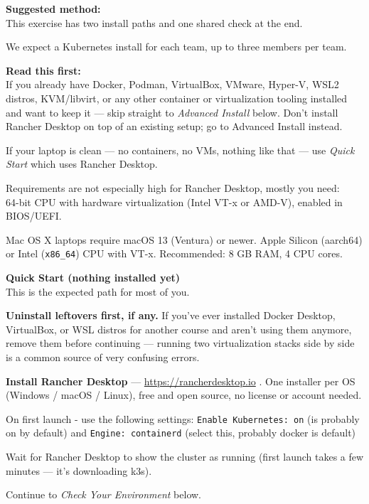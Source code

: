 \documentclass[a4paper,11pt,notitlepage]{report}
\begin{document}
{\bf Suggested method:}\\
This exercise has two install paths and one shared check at the end.

We expect a Kubernetes install for each team, up to three members per team.

{\bf Read this first:}\\
If you already have Docker, Podman, VirtualBox, VMware, Hyper-V, WSL2 distros, KVM/libvirt, or any other container or virtualization tooling installed and want to keep it — skip straight to \emph{Advanced Install} below. Don't install Rancher Desktop on top of an existing setup; go to Advanced Install instead.

If your laptop is clean — no containers, no VMs, nothing like that — use \emph{Quick Start} which uses Rancher Desktop.

Requirements are not especially high for Rancher Desktop, mostly you need:\\
64-bit CPU with hardware virtualization (Intel VT-x or AMD-V), enabled in BIOS/UEFI.

Mac OS X laptops require macOS 13 (Ventura) or newer. Apple Silicon (aarch64) or Intel (\verb+x86_64+) CPU with VT-x. Recommended: 8 GB RAM, 4 CPU cores.


{\bf Quick Start (nothing installed yet)}\\
This is the expected path for most of you.

\begin{list2}
\item[1.] {\bf Uninstall leftovers first, if any.} If you've ever installed Docker Desktop, VirtualBox, or WSL distros for another course and aren't using them anymore, remove them before continuing — running two virtualization stacks side by side is a common source of very confusing errors.
\item[2.] {\bf Install Rancher Desktop} — \url{https://rancherdesktop.io} . One installer per OS (Windows / macOS / Linux), free and open source, no license or account needed.
\item[3.] On first launch - use the following settings:
   \verb+Enable Kubernetes: on+   (is probably on by default) and
   \verb+Engine: containerd+      (select this, probably docker is default)
\item[4.] Wait for Rancher Desktop to show the cluster as running (first launch takes a few minutes — it's downloading k3s).
\item[5.] Continue to \emph{Check Your Environment} below.
\end{list2}
\end{document}
